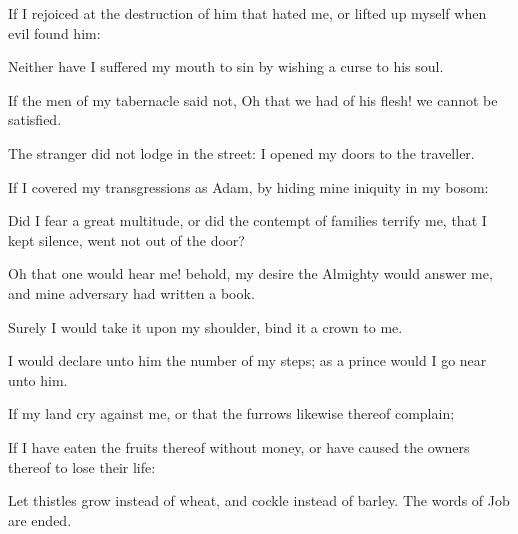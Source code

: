{If I
rejoiced at the
destruction of him that
hated me, or lifted
up myself when
evil
found him:

Neither have I
suffered my
mouth to
sin by
wishing a
curse to his
soul.

If the
men of my
tabernacle
said not, Oh that we
had of his
flesh! we cannot be
satisfied.

The
stranger did not
lodge in the
street:
{} I
opened my
doors to the
traveller.


\par }{\PP {}If I
covered my
transgressions as
Adam, by
hiding mine
iniquity in my
bosom:

Did I
fear a
great
multitude, or did the
contempt of
families
terrify me, that I kept
silence,
{} went not
out of the
door?

Oh
that one would
hear me! behold, my
desire
{} the
Almighty would
answer me, and
{} mine
adversary had
written a
book.

Surely I would
take it upon my
shoulder,
{}
bind it
{} a
crown to me.

I would
declare unto him the
number of my
steps; as a
prince would I go
near unto him.

If my
land
cry against me, or that the
furrows
likewise thereof
complain;

If I have
eaten the
fruits thereof without
money, or have caused the
owners thereof to
lose their
life:

Let
thistles
grow instead of
wheat, and
cockle instead of
barley. The
words of
Job are
ended.




\par }
